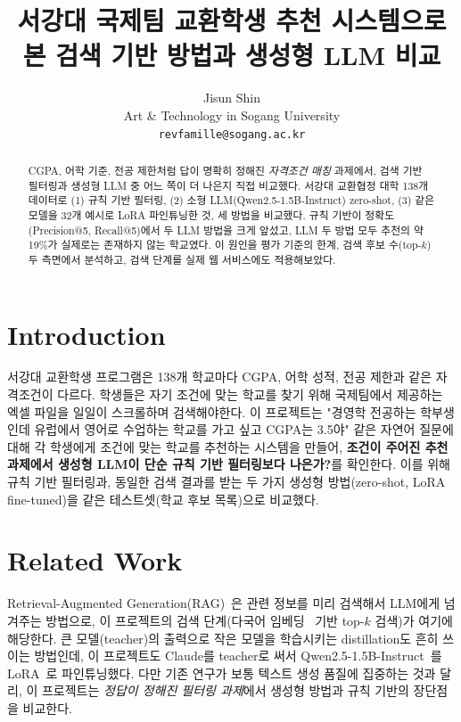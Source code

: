 \documentclass[10pt,twocolumn,letterpaper]{article}
\begin{document}
\title{서강대 국제팀 교환학생 추천 시스템으로 본 검색 기반 방법과 생성형 LLM 비교}

\author{Jisun Shin\\
Art \& Technology in Sogang University\\
{\tt\small revfamille@sogang.ac.kr}
}

\maketitle

\begin{abstract}
   CGPA, 어학 기준, 전공 제한처럼 답이 명확히 정해진 \emph{자격조건 매칭} 과제에서, 검색 기반 필터링과 생성형 LLM 중 어느 쪽이 더 나은지 직접 비교했다. 서강대 교환협정 대학 138개 데이터로 (1) 규칙 기반 필터링, (2) 소형 LLM(Qwen2.5-1.5B-Instruct) zero-shot, (3) 같은 모델을 32개 예시로 LoRA 파인튜닝한 것, 세 방법을 비교했다. 규칙 기반이 정확도(Precision@5, Recall@5)에서 두 LLM 방법을 크게 앞섰고, LLM 두 방법 모두 추천의 약 19\%가 실제로는 존재하지 않는 학교였다. 이 원인을 평가 기준의 한계, 검색 후보 수(top-$k$) 두 측면에서 분석하고, 검색 단계를 실제 웹 서비스에도 적용해보았다.
\end{abstract}

\section{Introduction}
\label{sec:intro}

서강대 교환학생 프로그램은 138개 학교마다 CGPA, 어학 성적, 전공 제한과 같은 자격조건이 다르다.
학생들은 자기 조건에 맞는 학교를 찾기 위해 국제팀에서 제공하는 엑셀 파일을 일일이 스크롤하며 검색해야한다. 이 프로젝트는 "경영학 전공하는 학부생인데 유럽에서 영어로 수업하는 학교를 가고 싶고 CGPA는 3.5야" 같은 자연어 질문에 대해 각 학생에게 조건에 맞는 학교를 추천하는 시스템을 만들어, \textbf{조건이 주어진 추천 과제에서 생성형 LLM이 단순 규칙 기반 필터링보다 나은가?}를 확인한다. 이를 위해 규칙 기반 필터링과, 동일한 검색 결과를 받는 두 가지 생성형 방법(zero-shot, LoRA fine-tuned)을 같은 테스트셋(학교 후보 목록)으로 비교했다.

\section{Related Work}
Retrieval-Augmented Generation(RAG)~\cite{lewis2020rag}은 관련 정보를 미리 검색해서 LLM에게 넘겨주는 방법으로, 이 프로젝트의 검색 단계(다국어 임베딩~\cite{reimers2019sentencebert} 기반
top-$k$ 검색)가 여기에 해당한다. 큰 모델(teacher)의 출력으로 작은 모델을 학습시키는 distillation도 흔히 쓰이는 방법인데, 이 프로젝트도 Claude를 teacher로 써서 Qwen2.5-1.5B-Instruct~\cite{qwen2024}를 LoRA~\cite{hu2021lora}로 파인튜닝했다. 다만 기존 연구가 보통 텍스트 생성 품질에 집중하는 것과 달리, 이 프로젝트는 \emph{정답이 정해진 필터링
과제}에서 생성형 방법과 규칙 기반의 장단점을 비교한다.
\end{document}
